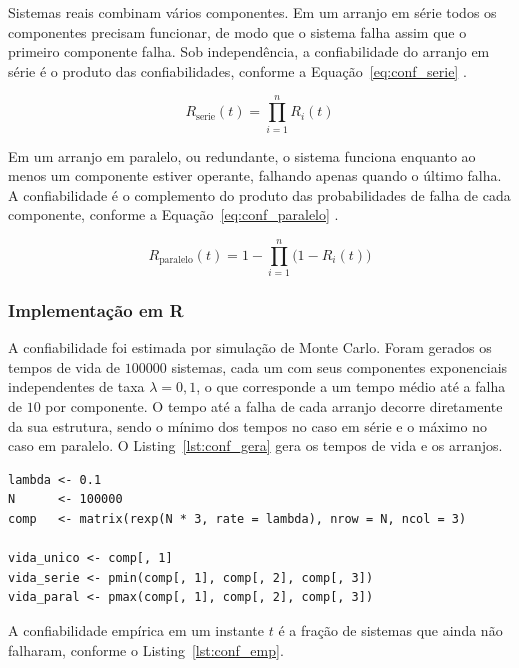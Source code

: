 Sistemas reais combinam vários componentes. Em um arranjo em série todos os
componentes precisam funcionar, de modo que o sistema falha assim que o primeiro
componente falha. Sob independência, a confiabilidade do arranjo em série é o
produto das confiabilidades, conforme a Equação~\ref{eq:conf_serie}
\cite{ross2010probabilidade}.

\begin{equation}
	R_{\text{serie}}(t) = \prod_{i=1}^{n} R_i(t)
	\label{eq:conf_serie}
\end{equation}

Em um arranjo em paralelo, ou redundante, o sistema funciona enquanto ao menos um
componente estiver operante, falhando apenas quando o último falha. A
confiabilidade é o complemento do produto das probabilidades de falha de cada
componente, conforme a Equação~\ref{eq:conf_paralelo} \cite{ross2010probabilidade}.

\begin{equation}
	R_{\text{paralelo}}(t) = 1 - \prod_{i=1}^{n} \bigl(1 - R_i(t)\bigr)
	\label{eq:conf_paralelo}
\end{equation}

\subsubsection{Implementação em R}

A confiabilidade foi estimada por simulação de Monte Carlo. Foram gerados os
tempos de vida de $100000$ sistemas, cada um com seus componentes exponenciais
independentes de taxa $\lambda = 0{,}1$, o que corresponde a um tempo médio até a
falha de $10$ por componente. O tempo até a falha de cada arranjo decorre diretamente da sua
estrutura, sendo o mínimo dos tempos no caso em série e o máximo no caso em
paralelo. O Listing~\ref{lst:conf_gera} gera os tempos de vida e os arranjos.

\begin{lstlisting}[caption={Geração dos tempos de vida e dos arranjos.}, label={lst:conf_gera}]
lambda <- 0.1
N      <- 100000
comp   <- matrix(rexp(N * 3, rate = lambda), nrow = N, ncol = 3)

vida_unico <- comp[, 1]
vida_serie <- pmin(comp[, 1], comp[, 2], comp[, 3])
vida_paral <- pmax(comp[, 1], comp[, 2], comp[, 3])
\end{lstlisting}

A confiabilidade empírica em um instante $t$ é a fração de sistemas que ainda não
falharam, conforme o Listing~\ref{lst:conf_emp}.


